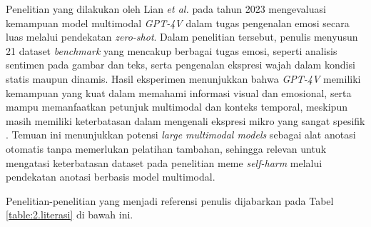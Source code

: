 Penelitian yang dilakukan oleh Lian \textit{et al.} pada tahun 2023 mengevaluasi kemampuan model multimodal \textit{GPT-4V} dalam tugas pengenalan emosi secara luas melalui pendekatan \textit{zero-shot}. Dalam penelitian tersebut, penulis menyusun 21 dataset \textit{benchmark} yang mencakup berbagai tugas emosi, seperti analisis sentimen pada gambar dan teks, serta pengenalan ekspresi wajah dalam kondisi statis maupun dinamis. Hasil eksperimen menunjukkan bahwa \textit{GPT-4V} memiliki kemampuan yang kuat dalam memahami informasi visual dan emosional, serta mampu memanfaatkan petunjuk multimodal dan konteks temporal, meskipun masih memiliki keterbatasan dalam mengenali ekspresi mikro yang sangat spesifik \cite{lian2023gpt4v}. Temuan ini menunjukkan potensi \textit{large multimodal models} sebagai alat anotasi otomatis tanpa memerlukan pelatihan tambahan, sehingga relevan untuk mengatasi keterbatasan dataset pada penelitian meme \textit{self-harm} melalui pendekatan anotasi berbasis model multimodal.


Penelitian-penelitian yang menjadi referensi penulis dijabarkan pada Tabel \ref{table:2.literasi} di bawah ini. \par

